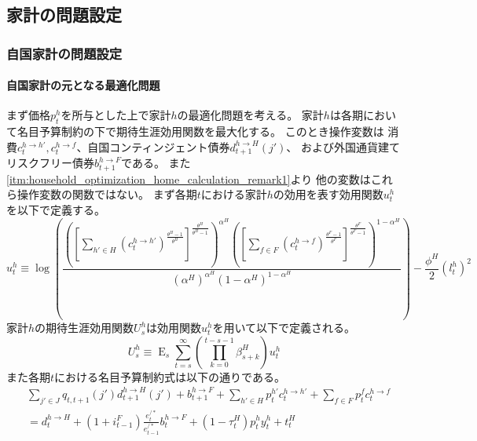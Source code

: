 
\subsection{家計の問題設定}
\label{sec:chapter3_households_problem_setup}

\subsubsection{自国家計の問題設定}
\label{sec:chapter3_households_problem_setup_home}

\paragraph{自国家計の元となる最適化問題}
\label{sec:chapter3_households_problem_setup_home_original}
まず価格\(p_t^h\)を所与とした上で家計\(h\)の最適化問題を考える。
家計\(h\)は各期において名目予算制約の下で期待生涯効用関数を最大化する。
このとき操作変数は
消費\(c_t^{h\to h'},c_t^{h\to f}\)、自国コンティンジェント債券\(d_{t+1}^{h\to H}(j')\)、
および外国通貨建てリスクフリー債券\(b_{t+1}^{h\to F}\)である。
また\ref{itm:household_optimization_home_calculation_remark1}より
他の変数はこれら操作変数の関数ではない。
まず各期\(t\)における家計\(h\)の効用を表す効用関数\(u_t^h\)を以下で定義する。
\begin{equation}
\label{form:chapter3_households_problem_setup_home_original_u_h_def}
    u_t^h\equiv\log\left(\frac{\left(\left[\sum_{h'\in H}(c_t^{h\to h'})^{\frac{\theta^H-1}{\theta^H}}\right]^{\frac{\theta^H}{\theta^H-1}}\right)^{\alpha^H}\left(\left[\sum_{f\in F}(c_t^{h\to f})^{\frac{\theta^F-1}{\theta^F}}\right]^{\frac{\theta^F}{\theta^F-1}}\right)^{1-\alpha^H}}{(\alpha^H)^{\alpha^H}(1-\alpha^H)^{1-\alpha^H}}\right)-\frac{\phi^H}{2}(l_t^h)^2
\end{equation}
家計\(h\)の期待生涯効用関数\(U_s^h\)は効用関数\(u_t^h\)を用いて以下で定義される。
\begin{equation}
\label{form:chapter3_households_problem_setup_home_original_U_h_def}
    U_s^h\equiv\operatorname{E}_s\sum_{t=s}^{\infty}\left(\prod_{k=0}^{t-s-1}\beta_{s+k}^H\right)u_t^h
\end{equation}
また各期\(t\)における名目予算制約式は以下の通りである。
\begin{equation}
\label{form:chapter3_households_problem_setup_home_original_budget_eq}
    \begin{split}
        &\sum_{j'\in J}q_{t,t+1}(j')d_{t+1}^{h\to H}(j')+b_{t+1}^{h\to F}
        +\sum_{h'\in H}p_t^{h'}c_t^{h\to h'}
        +\sum_{f\in F}p_t^fc_t^{h\to f}\\
        &=d_t^{h\to H}
        +(1+i_{t-1}^F)\frac{e_t^{/*}}{e_{t-1}^{/*}}b_t^{h\to F}
        +(1-\tau_t^H)p_t^hy_t^h+t_t^H
    \end{split}
\end{equation}
